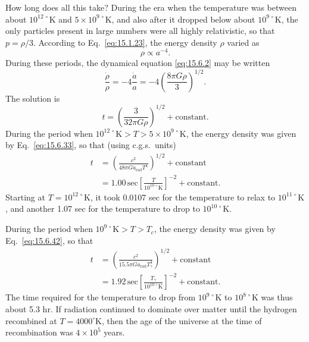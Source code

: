 How long does all this take? During the era when the temperature was between
about \(10^{12\,\circ}\mathrm K\) and \(5\times10^{9\,\circ}\mathrm K\), and
also after it dropped below about \(10^{9\,\circ}\mathrm K\), the only
particles present in large numbers were all highly relativistic, so that
\(p=\rho/3\). According to Eq.~\eqref{eq:15.1.23}, the energy density
\(\rho\) varied as
\[
  \rho\propto a^{-4}.
\]
During these periods, the dynamical equation \eqref{eq:15.6.2} may be written
\[
  \frac{\dot\rho}{\rho}
  =
  -4\frac{\dot a}{a}
  =
  -4\left(\frac{8\pi G\rho}{3}\right)^{1/2}.
\]
The solution is
\begin{equation}
  t
  =
  \left(\frac{3}{32\pi G\rho}\right)^{1/2}
  +\text{constant}.
  \tag{15.6.44}\label{eq:15.6.44}
\end{equation}
During the period when
\(10^{12\,\circ}\mathrm K>T>5\times10^{9\,\circ}\mathrm K\), the energy
density was given by Eq.~\eqref{eq:15.6.33}, so that (using c.g.s.\ units)
\[
  \begin{split}
    t
    &=
    \left(
      \frac{c^2}{48\pi G a_{\mathrm{rad}}T^4}
    \right)^{1/2}
    +\text{constant}
    \\
    &=
    1.00\,\mathrm{sec}
    \left[
      \frac{T}{10^{10\,\circ}\mathrm K}
    \right]^{-2}
    +\text{constant}.
  \end{split}
\]
Starting at \(T=10^{12\,\circ}\mathrm K\), it took 0.0107 sec for the
temperature to relax to \(10^{11\,\circ}\mathrm K\), and another 1.07 sec for
the temperature to drop to \(10^{10\,\circ}\mathrm K\).

During the period when \(10^{9\,\circ}\mathrm K>T>T_c\), the energy density
was given by Eq.~\eqref{eq:15.6.42}, so that
\[
  \begin{split}
    t
    &=
    \left(
      \frac{c^2}{15.5\pi G a_{\mathrm{rad}}T_\gamma^4}
    \right)^{1/2}
    +\text{constant}
    \\
    &=
    1.92\,\mathrm{sec}
    \left[
      \frac{T_\gamma}{10^{10\,\circ}\mathrm K}
    \right]^{-2}
    +\text{constant}.
  \end{split}
\]
The time required for the temperature to drop from
\(10^{9\,\circ}\mathrm K\) to \(10^{8\,\circ}\mathrm K\) was thus about
5.3 hr. If radiation continued to dominate over matter until the hydrogen
recombined at \(T=4000^\circ\mathrm K\), then the age of the universe at the
time of recombination was \(4\times10^5\) years.

